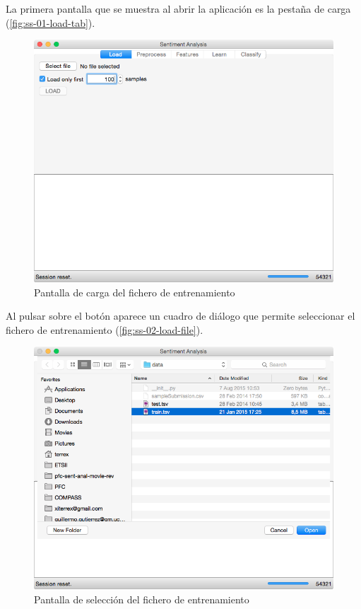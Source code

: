 La primera pantalla que se muestra al abrir la aplicación es la pestaña de carga (\autoref{fig:ss-01-load-tab}).

\begin{figure}[H]
\centering
\includegraphics[width=13cm]{ss-01-load-tab}
\caption{Pantalla de carga del fichero de entrenamiento}
\label{fig:ss-01-load-tab}
\end{figure}

\newpage
Al pulsar sobre el botón  aparece un cuadro de diálogo que permite seleccionar el fichero  de entrenamiento (\autoref{fig:ss-02-load-file}).

\begin{figure}[H]
\centering
\includegraphics[width=14cm]{ss-02-load-file}
\caption{Pantalla de selección del fichero de entrenamiento}
\label{fig:ss-02-load-file}
\end{figure}

